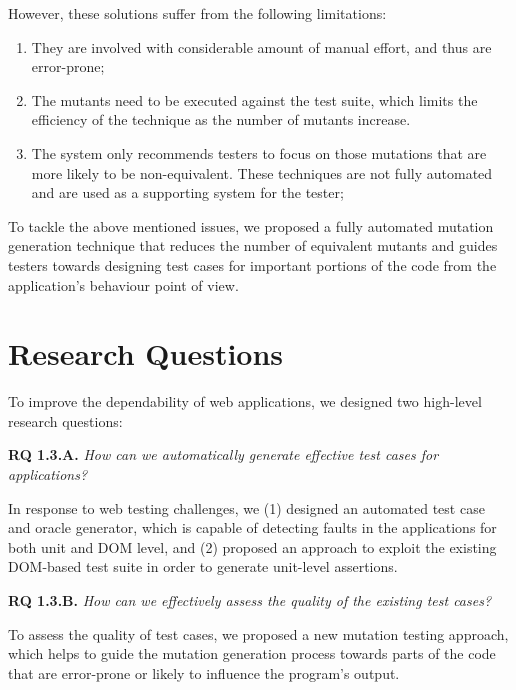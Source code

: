 However, these solutions suffer from the following limitations:
\begin{enumerate}
\item They are involved with considerable amount of manual effort, and thus are error-prone;
\item The mutants need to be executed against the test suite, which limits the efficiency of the technique as the number of mutants increase.
\item The system only recommends testers to focus on those mutations that are more likely to be non-equivalent. These techniques are not fully automated and are used as a supporting system for the tester;  
\end{enumerate}
To tackle the above mentioned issues, we proposed a fully automated mutation generation technique that reduces the number of equivalent mutants and guides testers towards designing test cases for important portions of the code from the application's behaviour point of view. 
 
\section{Research Questions} \label{Sec:researchq}
To improve the dependability of \javascript web applications, we designed two high-level research questions: 

{\bf RQ 1.3.A.} \emph{How can we automatically generate effective test cases for \javascript applications?}

In response to web testing challenges, we (1) designed an automated test case and oracle generator, which is capable of detecting faults
in the \javascript applications for both unit and DOM level, and (2) proposed an approach to exploit the existing DOM-based test suite in order to generate unit-level assertions. 

{\bf RQ 1.3.B.} \emph{How can we effectively assess the quality of the existing \javascript test cases?}

To assess the quality of test cases, we proposed a new \javascript mutation testing approach, which helps to guide the
mutation generation process towards parts of the code that are error-prone or likely to influence the program's output.

